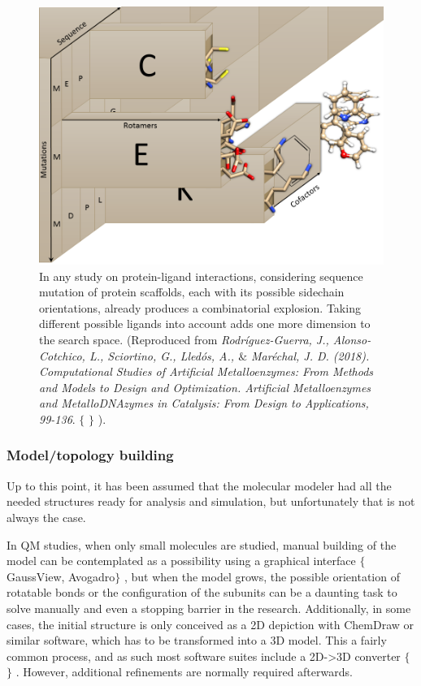 \begin{figure}[H]
	\includegraphics[width=\textwidth]{./figures/02/chemical_space.png}
	\caption[Chemobiological spaces]{
		In any study on protein-ligand interactions, considering sequence mutation of protein scaffolds, each with its possible sidechain orientations, already produces a combinatorial explosion. Taking different possible ligands into account adds one more dimension to the search space. (Reproduced from \textit{Rodríguez-Guerra, J., Alonso-Cotchico, L., Sciortino, G., Lledós, A., $\&$  Maréchal, J. D. (2018). Computational Studies of Artificial Metalloenzymes: From Methods and Models to Design and Optimization. Artificial Metalloenzymes and MetalloDNAzymes in Catalysis: From Design to Applications, 99-136}. $ \{ $ $ \} $ ).
	}
	\label{fig:chemicalspace}
\end{figure}

\subsubsection{Model/topology building}
Up to this point, it has been assumed that the molecular modeler had all the needed structures ready for analysis and simulation, but unfortunately that is not always the case.

In QM studies, when only small molecules are studied, manual building of the model can be contemplated as a possibility using a graphical interface $ \{ $ GaussView, Avogadro$ \} $ , but when the model grows, the possible orientation of rotatable bonds or the configuration of the subunits can be a daunting task to solve manually and even a stopping barrier in the research. Additionally, in some cases, the initial structure is only conceived as a 2D depiction with ChemDraw or similar software, which has to be transformed into a 3D model. This a fairly common process, and as such most software suites include a 2D->3D converter $ \{ $ $ \} $ . However, additional refinements are normally required afterwards.

